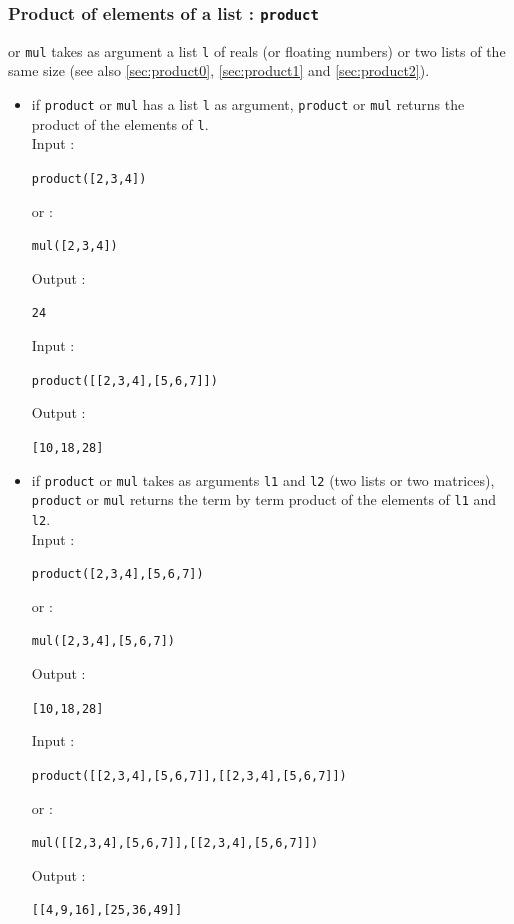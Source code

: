 \documentclass[a4paper,11pt]{book}
\begin{document}
\subsubsection{Product of elements of a list : {\tt product}}
 or {\tt mul} takes as argument a list {\tt l}
of reals (or floating numbers) or two lists of the same size (see 
also \ref{sec:product0}, \ref{sec:product1} and  \ref{sec:product2}).
\begin{itemize}
\item if {\tt product} or {\tt mul} has a list {\tt l}
as argument, {\tt product} or 
{\tt mul} returns the product of the elements of {\tt l}\label{sec:product}.\\
Input :
\begin{center}{\tt product([2,3,4])}\end{center}
or :
\begin{center}{\tt mul([2,3,4])}\end{center}
Output :
\begin{center}{\tt 24}\end{center}
Input :
\begin{center}{\tt product([[2,3,4],[5,6,7]])}\end{center}
Output :
\begin{center}{\tt [10,18,28]}\end{center}
\item if {\tt product}  or {\tt mul} takes as arguments 
{\tt l1} and {\tt l2}
(two lists or two matrices), {\tt product}  or {\tt mul} returns
the term by  term  product of the elements of {\tt l1} and 
{\tt l2}.\\
Input :
\begin{center}{\tt product([2,3,4],[5,6,7])}\end{center}
or :
\begin{center}{\tt mul([2,3,4],[5,6,7])}\end{center}
Output :
\begin{center}{\tt [10,18,28]}\end{center}
Input :
\begin{center}{\tt product([[2,3,4],[5,6,7]],[[2,3,4],[5,6,7]])}\end{center}
or :
\begin{center}{\tt mul([[2,3,4],[5,6,7]],[[2,3,4],[5,6,7]])}\end{center}
Output :
\begin{center}{\tt [[4,9,16],[25,36,49]]}\end{center}
\end{itemize}
\end{document}
